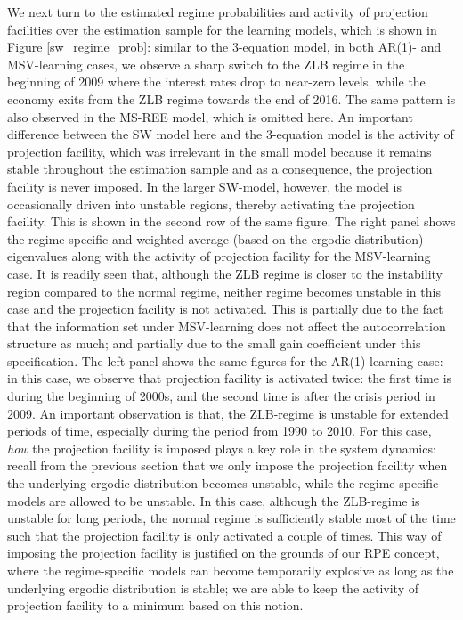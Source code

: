\documentclass[12pt,reqno]{article}
\numberwithin{equation}{section}
\begin{document}
We next turn to the estimated regime probabilities and activity of projection facilities over the estimation sample for the learning models, which is shown in Figure \ref{sw_regime_prob}: similar to the 3-equation model, in both AR(1)- and MSV-learning cases, we observe a sharp switch to the ZLB regime in the beginning of 2009 where the interest rates drop to near-zero levels, while the economy exits from the ZLB regime towards the end of 2016. The same pattern is also observed in the MS-REE model, which is omitted here. An important difference between the SW model here and the 3-equation model is the activity of projection facility, which was irrelevant in the small model because it remains stable throughout the estimation sample and as a consequence, the projection facility is never imposed. In the larger SW-model, however, the model is occasionally driven into unstable regions, thereby activating the projection facility. This is shown in the second row of the same figure. The right panel shows the regime-specific and weighted-average (based on the ergodic distribution) eigenvalues along with the activity of projection facility for the MSV-learning case. It is readily seen that, although the ZLB regime is closer to the instability region compared to the normal regime, neither regime becomes unstable in this case and the projection facility is not activated. This is partially due to the fact that the information set under MSV-learning does not affect the autocorrelation structure as much; and partially due to the small gain coefficient under this specification. The left panel shows the same figures for the AR(1)-learning case: in this case, we observe that projection facility is activated twice: the first time is during the beginning of 2000s, and the second time is after the crisis period in 2009. An important observation is that, the ZLB-regime is unstable for extended periods of time, especially during the period from 1990 to 2010. For this case, \textit{how} the projection facility is imposed plays a key role in the system dynamics: recall from the previous section that we only impose the projection facility when the underlying ergodic distribution becomes unstable, while the regime-specific models are allowed to be unstable. In this case, although the ZLB-regime is unstable for long periods, the normal regime is sufficiently stable most of the time such that the projection facility is only activated a couple of times. This way of imposing the projection facility is justified on the grounds of our RPE concept, where the regime-specific models can become temporarily explosive as long as the underlying ergodic distribution is stable; we are able to keep the activity of projection facility to a minimum based on this notion. \\
\end{document}

